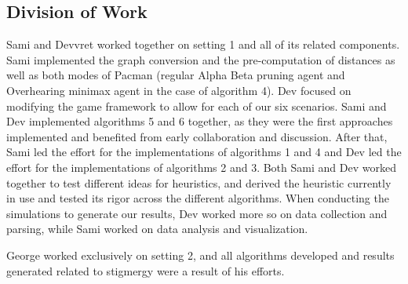 \documentclass[11pt]{article}
\begin{document}
\begin{multicols}{2}
\section{Division of Work}
Sami and Devvret worked together on setting 1 and all of its related components. Sami implemented the graph conversion and the pre-computation of distances as well as both modes of Pacman (regular Alpha Beta pruning agent and Overhearing minimax agent in the case of algorithm 4). Dev focused on modifying the game framework to allow for each of our six scenarios. Sami and Dev implemented algorithms 5 and 6 together, as they were the first approaches implemented and benefited from early collaboration and discussion. After that, Sami led the effort for the implementations of algorithms 1 and 4 and Dev led the effort for the implementations of algorithms 2 and 3. Both Sami and Dev worked together to test different ideas for heuristics, and derived the heuristic currently in use and tested its rigor across the different algorithms. When conducting the simulations to generate our results, Dev worked more so on data collection and parsing, while Sami worked on data analysis and visualization.  

George worked exclusively on setting 2, and all algorithms developed and results generated related to stigmergy were a result of his efforts.





\end{multicols}
\end{document}
